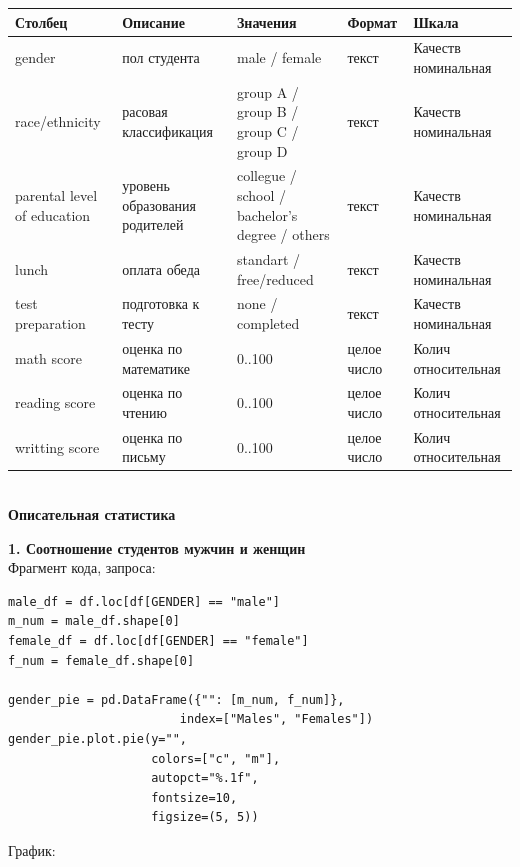 \documentclass[12pt,a4paper]{article}
\begin{document}
\begin{tabular}{ | p{100pt} | p{100pt} | p{100pt} | p{40pt} | p{60pt} |}
\hline
Столбец & Описание & Значения & Формат & Шкала  \\ \hline
gender & пол студента & male / female & текст & Качеств номинальная \\ \hline
race/ethnicity & расовая классификация & group A / group B / group C / group D & текст & Качеств номинальная  \\ \hline
parental level of education & уровень образования родителей & collegue / school / bachelor's degree / others  & текст & Качеств номинальная  \\ \hline
lunch & оплата обеда & standart / free/reduced & текст & Качеств номинальная  \\ \hline
test preparation & подготовка к тесту & none / completed & текст & Качеств номинальная  \\ \hline
math score & оценка по математике & 0..100 & целое число & Колич относительная  \\ \hline
reading score & оценка по чтению & 0..100 & целое число & Колич относительная  \\ \hline
writting score & оценка по письму & 0..100 & целое число & Колич относительная  \\ \hline
\end{tabular}
\\


\newpage
\large \textbf{Описательная статистика}

\textbf{1. Соотношение студентов мужчин и женщин}\\
Фрагмент кода, запроса:
\begin{verbatim}
male_df = df.loc[df[GENDER] == "male"]
m_num = male_df.shape[0]
female_df = df.loc[df[GENDER] == "female"]
f_num = female_df.shape[0]

gender_pie = pd.DataFrame({"": [m_num, f_num]},
                        index=["Males", "Females"])
gender_pie.plot.pie(y="",
                    colors=["c", "m"],
                    autopct="%.1f",
                    fontsize=10,
                    figsize=(5, 5))
\end{verbatim}


График: \\
\end{document}

